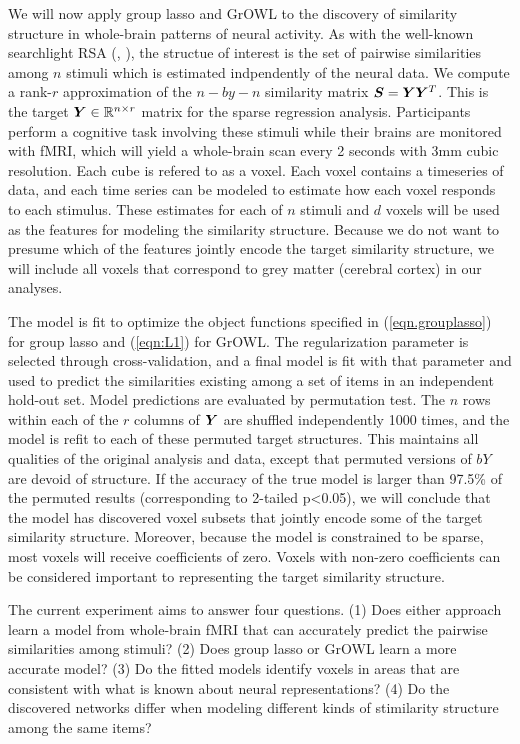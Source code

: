 We will now apply group lasso and GrOWL to the discovery of similarity structure in
whole-brain patterns of neural activity. As with the well-known searchlight RSA (\cite{RSA},
\cite{similarity}), the structue of interest is the set of pairwise similarities among $n$ 
stimuli which is estimated indpendently of the neural data. We compute a rank-$r$
approximation of the $n-by-n$ similarity matrix $\boldsymbol{S} = \boldsymbol{Y} \boldsymbol{Y}^T$. This is the target $\boldsymbol{Y}
\in {\mathbb R}^{n \times r} $ matrix for the sparse regression analysis. Participants
perform a cognitive task involving these stimuli while their brains are monitored with
fMRI, which will yield a whole-brain scan every 2 seconds with 3mm cubic resolution. Each
cube is refered to as a voxel. Each voxel contains a timeseries of data, and each time
series can be modeled to estimate how each voxel responds to each stimulus. These estimates
for each of $n$ stimuli and $d$ voxels will be used as the features for modeling the
similarity structure. Because we do not want to presume which of the features jointly
encode the target similarity structure, we will include all voxels that correspond to grey
matter (cerebral cortex) in our analyses.

The model is fit to optimize the object functions specified in (\ref{eqn.grouplasso}) for
group lasso and (\ref{eqn:L1}) for GrOWL. The regularization parameter is selected through
cross-validation, and a final model is fit with that parameter and used to predict the
similarities existing among a set of items in an independent hold-out set. Model
predictions are evaluated by permutation test. The $n$ rows within each of the $r$ columns
of $\boldsymbol{Y}$ are shuffled independently 1000 times, and the model is refit to each of these
permuted target structures. This maintains all qualities of the original analysis and data,
except that permuted versions of $bY$ are devoid of structure. If the accuracy of the true
model is larger than 97.5\% of the permuted results (corresponding to 2-tailed p<0.05), we
will conclude that the model has discovered voxel subsets that jointly encode some of the
target similarity structure. Moreover, because the model is constrained to be sparse, most
voxels will receive coefficients of zero. Voxels with non-zero coefficients can be
considered important to representing the target similarity structure.

The current experiment aims to answer four questions. (1) Does either approach learn a
model from whole-brain fMRI that can accurately predict the pairwise similarities among
stimuli? (2) Does group lasso or GrOWL learn a more accurate model? (3) Do the fitted
models identify voxels in areas that are consistent with what is known about neural
representations? (4) Do the discovered networks differ when modeling different kinds of
stimilarity structure among the same items?

